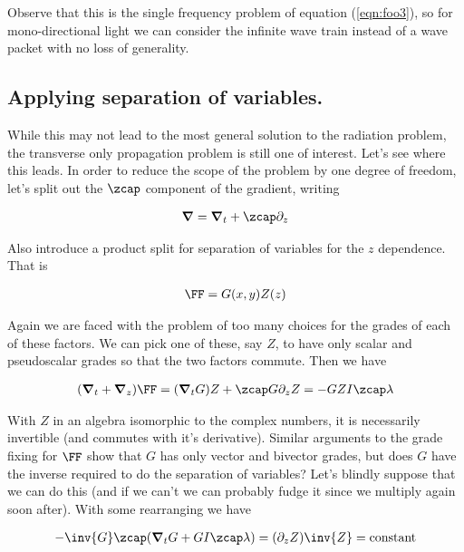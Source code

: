 Observe that this is the single frequency problem of equation (\ref{eqn:foo3}), so for mono-directional light we can consider the infinite wave train instead of a wave packet with no loss of generality.

\subsection{Applying separation of variables.}

While this may not lead to the most general solution to the radiation problem, the transverse only propagation problem is still one of interest.  Let's see where this leads.  In order to reduce the scope of the problem by one degree of freedom, let's split out the $\zcap$ component of the gradient, writing

\begin{align}\label{eqn:fooc1}
\spacegrad = \spacegrad_t + \zcap \partial_z
\end{align}

Also introduce a product split for separation of variables for the $z$ dependence.  That is

\begin{align}\label{eqn:fooc2}
\FF = G(x,y) Z(z)
\end{align}

Again we are faced with the problem of too many choices for the grades of each of these factors.  We can pick one of these, say $Z$, to have only scalar and pseudoscalar grades so that the two factors commute.  Then we have

\begin{align*}
(\spacegrad_t + \spacegrad_z) \FF = (\spacegrad_t G) Z + \zcap G \partial_z Z = -G Z I \zcap \lambda 
\end{align*}

With $Z$ in an algebra isomorphic to the complex numbers, it is necessarily invertible (and commutes with it's derivative).  Similar arguments to the grade fixing for $\FF$ show that $G$ has only vector and bivector grades, but does $G$ have the inverse required to do the separation of variables?  Let's blindly suppose that we can do this (and if we can't we can probably fudge it since we multiply again soon after).  With some rearranging we have

\begin{align}\label{eqn:fooc3}
-\inv{G} \zcap (\spacegrad_t G + G I \zcap \lambda) = (\partial_z Z)\inv{Z} = \text{constant}
\end{align}

